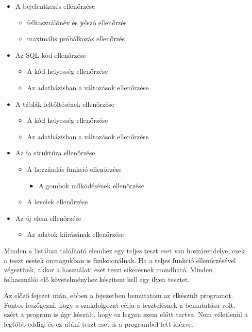 \begin{itemize}
	\item A bejelentkezés ellenőrzése
		\begin{itemize}
			\item felhasználónév és jelszó ellenőrzés
			\item maximális próbálkozás ellenőrzés
		\end{itemize}
	\item Az SQL kód ellenőrzése
		\begin{itemize}
			\item A kód helyesség ellenőrzése
			\item Az adatbázisban a változások ellenőrzése
		\end{itemize}
	\item A táblák feltöltésének ellenőrzése
		\begin{itemize}
			\item A kód helyesség ellenőrzése
			\item Az adatbázisban a változások ellenőrzése
		\end{itemize}
	\item Az fa struktúra ellenőrzése
		\begin{itemize}
			\item A hozzáadás funkció ellenőrzése
				\begin{itemize}
					\item A gombok működésének ellenőrzése
				\end{itemize}
			\item A levelek ellenőrzése
		\end{itemize}
	\item Az új elem ellenőrzése
		\begin{itemize}
			\item Az adatok kiírásának ellenőrzése
		\end{itemize}
\end{itemize}
Minden a listában található elemhez egy teljes teszt eset van hozzárendelve, ezek a teszt esetek önmagukban is funkcionálnak. 
Ha a teljes funkció ellenőrzésével végeztünk, akkor a használati eset teszt sikeresnek mondható. Minden felhasználói elő követelményhez készíteni kell egy ilyen tesztet.



Az előző fejezet után, ebben a fejezetben bemutatom az elkészült programot. Fontos leszögezni, hogy a szakdolgozat célja a tesztelésnek a bemutatása volt, ezért a program is úgy készült, hogy ez legyen szem előtt tartva. Nem véletlenül a legtöbb eddigi és ez utáni teszt eset is a programból lett idézve.\\

